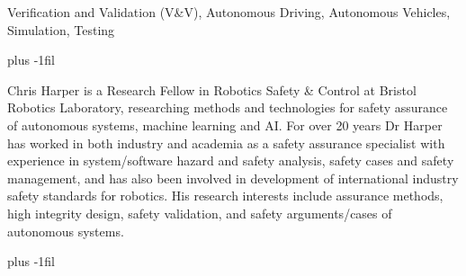 \documentclass[letterpaper, 10 pt, journal, twoside]{IEEEtran}
\newcommand{\pathToSourceFiles}{../source}
\begin{document}
\begin{IEEEkeywords}
Verification and Validation (V\&V), Autonomous Driving, Autonomous Vehicles, Simulation, Testing
\end{IEEEkeywords}
\IEEEpeerreviewmaketitle 




\printbibliography

\baselineskip plus -1fil  
\begin{IEEEbiography}{Chris Harper}
is a Research Fellow in Robotics Safety \& Control at Bristol Robotics Laboratory, researching methods and technologies for safety assurance of autonomous systems, machine learning and AI. For over 20 years Dr Harper has worked in both industry and academia as a safety assurance specialist with experience in system/software hazard and safety analysis, safety cases and safety management, and has also been involved in development of international industry safety standards for robotics. His research interests include assurance methods, high integrity design, safety validation, and safety arguments/cases of autonomous systems. 
\end{IEEEbiography}
\baselineskip plus -1fil  
\end{document}

